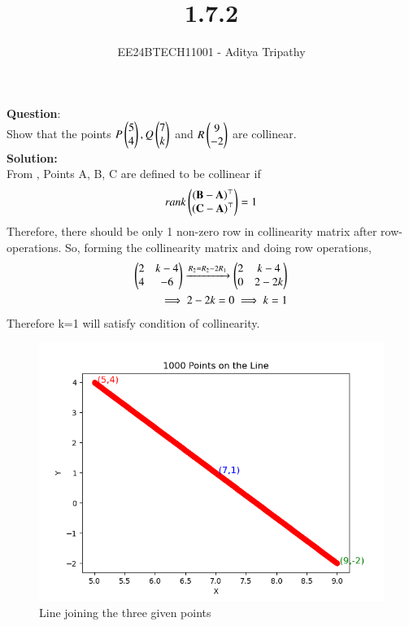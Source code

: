 \documentclass[journal]{IEEEtran}
\begin{document}

\vspace{3cm}

\title{1.7.2}
\author{EE24BTECH11001 - Aditya Tripathy
}
 \maketitle
{\let\newpage\relax\maketitle}

\renewcommand{\thefigure}{\theenumi}
\renewcommand{\thetable}{\theenumi}
\setlength{\intextsep}{10pt} %


\renewcommand{\thetable}{\theenumi}


\textbf{Question}:\\
Show that the points $P\begin{pmatrix}5\\4\end{pmatrix}, Q\begin{pmatrix}7\\k\end{pmatrix}$ and $R\begin{pmatrix}9\\-2\end{pmatrix}$ are collinear.
\\
\textbf{Solution: }\\
From , Points A, B, C are defined to be collinear if
\begin{align} 
	rank\begin{pmatrix}\left(\mathbf{B}-\mathbf{A}\right)^\top \\ \left(\mathbf{C}-\mathbf{A}\right)^\top \end{pmatrix} = 1\\
\end{align}
Therefore, there should be only 1 non-zero row in collinearity matrix after row-operations.
So, forming the collinearity matrix and doing row operations,
\begin{align}
	\begin{pmatrix}2&k-4\\4&-6\end{pmatrix} \xrightarrow{R_2 = R_2-2R_1}  \begin{pmatrix}2&k-4\\0&2-2k\end{pmatrix}\\
	\implies 2-2k = 0 \implies k = 1
\end{align}
Therefore k=1 will satisfy condition of collinearity.
\begin{figure}[h!]
   \centering
   \includegraphics[width=0.7\linewidth]{figs/fig.png}
   \caption{Line joining the three given points}
\end{figure}
\end{document}
